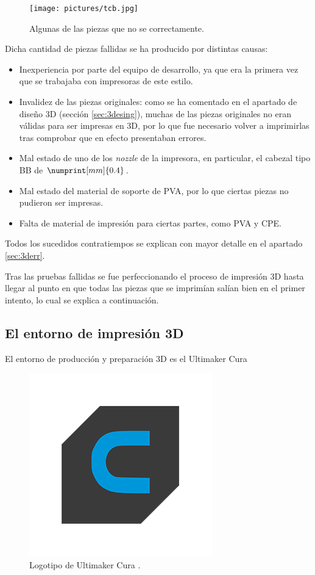 \begin{figure}[H]
    \centering
    \texttt{[image: pictures/tcb.jpg]}
    \caption{Algunas de las piezas que no se correctamente.}
    \label{fig:tcb}
\end{figure}

Dicha cantidad de piezas fallidas se ha producido por distintas causas:

\begin{itemize}
    \item Inexperiencia por parte del equipo de desarrollo, ya que era la primera vez
    que se trabajaba con impresoras de este estilo.

    \item Invalidez de las piezas originales: como se ha comentado en el apartado de
    diseño 3D (sección \ref{sec:3desing}), muchas de las piezas originales no eran
    válidas para ser impresas en 3D, por lo que fue necesario volver a imprimirlas
    tras comprobar que en efecto presentaban errores.

    \item Mal estado de uno de los \textit{nozzle} de la impresora, en particular,
    el cabezal tipo BB de $\numprint[mm]{0.4}$.

    \item Mal estado del material de soporte de \ac{PVA}, por lo que ciertas piezas
    no pudieron ser impresas.

    \item Falta de material de impresión para ciertas partes, como \ac{PVA} y \ac{CPE}.
\end{itemize}

Todos los sucedidos contratiempos se explican con mayor detalle en el apartado
\ref{sec:3derr}.

Tras las pruebas fallidas se fue perfeccionando el proceso de impresión 3D hasta llegar
al punto en que todas las piezas que se imprimían salían bien en el primer intento, lo
cual se explica a continuación.

\subsection{El entorno de impresión 3D}
El entorno de producción y preparación 3D es el Ultimaker Cura

\begin{figure}[H]
    \centering
    \includegraphics[width=.5\linewidth]{pictures/Ultimaker_cura.png}
    \caption*{Logotipo de Ultimaker Cura \cite{CuraSoftware2019}.}
\end{figure}

